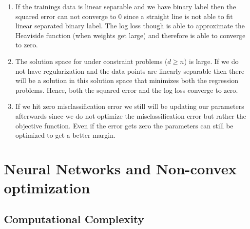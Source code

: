\documentclass[12pt]{article}
\begin{document}
\begin{enumerate}
	\item If the trainings data is linear separable and we have binary label then the squared error can not converge to 0 since a straight line is not able to fit linear separated binary label. The log loss though is able to approximate the Heaviside function (when weights get large) and therefore is able to converge to zero.
	\item The solution space for under constraint problems ($d\geq n$) is large. If we do not have regularization and the data points are linearly separable then there will be a solution in this solution space that minimizes both the regression problems. Hence, both the squared error and the log loss converge to zero. 
	\item If we hit zero misclassification error we still will be updating our parameters afterwards since we do not optimize the misclassification error but rather the objective function. Even if the error gets zero the parameters can still be optimized to get a better margin. 
\end{enumerate}

\section{Neural Networks and Non-convex optimization}

\subsection{Computational Complexity}
\end{document}
